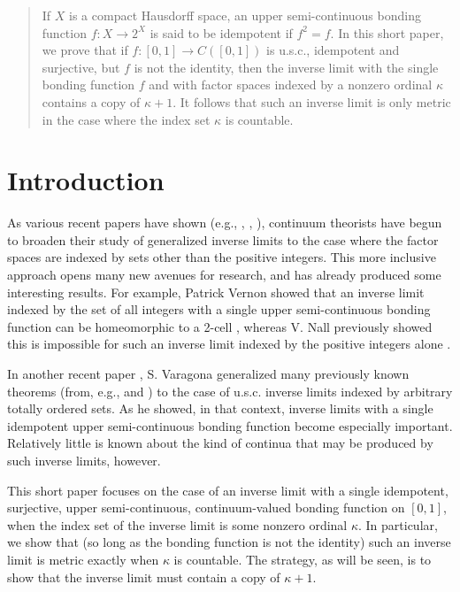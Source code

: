 \documentclass{amsart}
\theoremstyle{definition}
\begin{document}
\begin{abstract}
If $X$ is a compact Hausdorff space, an upper semi-continuous bonding function $f: X \rightarrow 2^{X}$ is said to be idempotent if $f^2 = f$. In this short paper, we prove that if $f: [0,1] \rightarrow C([0,1])$ is u.s.c., idempotent and surjective, but $f$ is not the identity, then the inverse limit with the single bonding function $f$ and with factor spaces indexed by a nonzero ordinal $\kappa$ contains a copy of $\kappa + 1$. It follows that such an inverse limit is only metric in the case where the index set $\kappa$ is countable.
\end{abstract}

\maketitle

\section{Introduction}

As various recent papers have shown (e.g., \cite{char roe}, \cite{varagona}, \cite{vernon}), continuum theorists have begun to broaden their study of generalized inverse limits to the case where the factor spaces are indexed by sets other than the positive integers. This more inclusive approach opens many new avenues for research, and has already produced some interesting results. For example, Patrick Vernon showed that an inverse limit indexed by the set of all integers with a single upper semi-continuous bonding function can be homeomorphic to a 2-cell \cite{vernon}, whereas V. Nall previously showed this is impossible for such an inverse limit indexed by the positive integers alone \cite{nall 2cell}.

In another recent paper \cite{varagona}, S. Varagona generalized many previously known theorems (from, e.g., \cite{ingram mahavier} and \cite{nall connected}) to the case of u.s.c. inverse limits indexed by arbitrary totally ordered sets. As he showed, in that context, inverse limits with a single idempotent upper semi-continuous bonding function become especially important. Relatively little is known about the kind of continua that may be produced by such inverse limits, however.

This short paper focuses on the case of an inverse limit with a single idempotent, surjective, upper semi-continuous, continuum-valued bonding function on $[0,1]$, when the index set of the inverse limit is some nonzero ordinal $\kappa$. In particular, we show that (so long as the bonding function is not the identity) such an inverse limit is metric exactly when $\kappa$ is countable. The strategy, as will be seen, is to show that the inverse limit must contain a copy of $\kappa + 1$.
\end{document}
